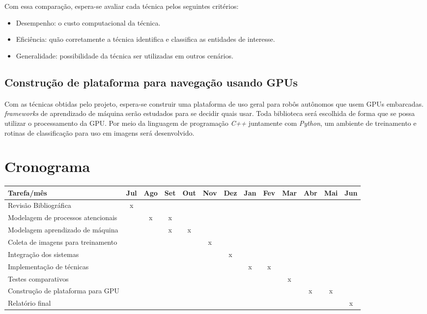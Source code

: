 \documentclass[11pt]{article}
\newcommand{\tit}[1]{\textit{#1}}
\begin{document}
Com essa comparação, espera-se avaliar cada técnica pelos seguintes critérios:
\begin{itemize}
	\item Desempenho: o custo computacional da técnica.
	\item Eficiência: quão corretamente a técnica identifica e classifica
		as entidades de interesse.
	\item Generalidade: possibilidade da técnica ser utilizadas em outros 
		cenários.
\end{itemize}

\subsection{Construção de plataforma para navegação usando GPUs}
\paragraph{}
Com as técnicas obtidas pelo projeto, espera-se construir uma plataforma
de uso geral para robôs autônomos que usem GPUs embarcadas.
\tit{frameworks} de aprendizado de máquina serão estudados para se decidir
quais usar. 
Toda biblioteca será escolhida de forma que se possa utilizar o processamento
da GPU.
Por meio da linguagem de programação \tit{C++} juntamente com \tit{Python},  
um ambiente de treinamento e rotinas de classificação para uso em imagens
será desenvolvido.


\section{Cronograma}
\paragraph{}
\begin{table}[H]
\centering
\setlength{\tabcolsep}{.16667em}
\begin{tabular}{|C{5cm}|c|c|c|c|c|c|c|c|c|c|c|c|}
	\hline
	Tarefa/mês & Jul & Ago & Set & Out & Nov & Dez & Jan & Fev & Mar & Abr & Mai & 
	Jun \\
	\hline
	Revisão Bibliográfica & x & & & & & & & & & & & \\
	\hline
	Modelagem de processos atencionais & & x & x & & & & & & & & & \\
	\hline
	Modelagem aprendizado de máquina & & & x & x & & & & & & & & \\
	\hline
	Coleta de imagens para treinamento & & & & & x & & & & & & & \\
	\hline
	Integração dos sistemas & & & & & & x & & & & & & \\
	\hline
	Implementação de técnicas & & & & & & & x & x & & & & \\
	\hline
	Testes comparativos & & & & & & &  & & x & & & \\
	\hline
	Construção de plataforma para GPU & & & & & & & & & & x & x & \\
	\hline
	Relatório final & & & & & & & & & & & & x \\
	\hline
\end{tabular}
\end{table}

\printbibliography
\end{document}
